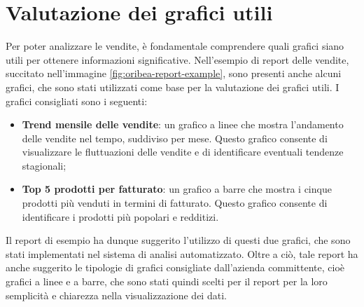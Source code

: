 \section{Valutazione dei grafici utili}

Per poter analizzare le vendite, è fondamentale comprendere quali grafici siano utili per ottenere informazioni significative. Nell'esempio di report delle vendite, succitato nell'immagine \ref{fig:oribea-report-example}, sono presenti anche alcuni grafici, che sono stati utilizzati come base per la valutazione dei grafici utili.
I grafici consigliati sono i seguenti:
\begin{itemize}
    \item \textbf{Trend mensile delle vendite}: un grafico a linee che mostra l'andamento delle vendite nel tempo, suddiviso per mese. Questo grafico consente di visualizzare le fluttuazioni delle vendite e di identificare eventuali tendenze stagionali;
    \item \textbf{Top 5 prodotti per fatturato}: un grafico a barre che mostra i cinque prodotti più venduti in termini di fatturato. Questo grafico consente di identificare i prodotti più popolari e redditizi.
\end{itemize}

Il report di esempio ha dunque suggerito l'utilizzo di questi due grafici, che sono stati implementati nel sistema di analisi automatizzato. Oltre a ciò, tale report ha anche suggerito le tipologie di grafici consigliate dall'azienda committente, cioè grafici a linee e a barre, che sono stati quindi scelti per il report per la loro semplicità e chiarezza nella visualizzazione dei dati.

